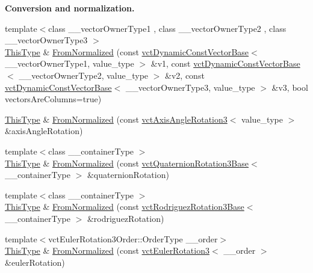 \begin{Indent}{\bf Conversion and normalization.}
\begin{DoxyCompactItemize}
\item 
{\footnotesize template$<$class \-\_\-\-\_\-vector\-Owner\-Type1 , class \-\_\-\-\_\-vector\-Owner\-Type2 , class \-\_\-\-\_\-vector\-Owner\-Type3 $>$ }\\\hyperlink{classvct_matrix_rotation3_base_a027be766cb10ca3c2ad8e85c28ed0af9}{This\-Type} \& \hyperlink{classvct_matrix_rotation3_base_a454968ed7ecbb2aefb9c63a8fe49df52}{From\-Normalized} (const \hyperlink{classvct_dynamic_const_vector_base}{vct\-Dynamic\-Const\-Vector\-Base}$<$ \-\_\-\-\_\-vector\-Owner\-Type1, value\-\_\-type $>$ \&v1, const \hyperlink{classvct_dynamic_const_vector_base}{vct\-Dynamic\-Const\-Vector\-Base}$<$ \-\_\-\-\_\-vector\-Owner\-Type2, value\-\_\-type $>$ \&v2, const \hyperlink{classvct_dynamic_const_vector_base}{vct\-Dynamic\-Const\-Vector\-Base}$<$ \-\_\-\-\_\-vector\-Owner\-Type3, value\-\_\-type $>$ \&v3, bool vectors\-Are\-Columns=true)
\item 
\hyperlink{classvct_matrix_rotation3_base_a027be766cb10ca3c2ad8e85c28ed0af9}{This\-Type} \& \hyperlink{classvct_matrix_rotation3_base_acda2e44cd70ae8b945712f9f7996bccf}{From\-Normalized} (const \hyperlink{classvct_axis_angle_rotation3}{vct\-Axis\-Angle\-Rotation3}$<$ value\-\_\-type $>$ \&axis\-Angle\-Rotation)
\item 
{\footnotesize template$<$class \-\_\-\-\_\-container\-Type $>$ }\\\hyperlink{classvct_matrix_rotation3_base_a027be766cb10ca3c2ad8e85c28ed0af9}{This\-Type} \& \hyperlink{classvct_matrix_rotation3_base_a343aca40687cf93638400f363dc44379}{From\-Normalized} (const \hyperlink{classvct_quaternion_rotation3_base}{vct\-Quaternion\-Rotation3\-Base}$<$ \-\_\-\-\_\-container\-Type $>$ \&quaternion\-Rotation)
\item 
{\footnotesize template$<$class \-\_\-\-\_\-container\-Type $>$ }\\\hyperlink{classvct_matrix_rotation3_base_a027be766cb10ca3c2ad8e85c28ed0af9}{This\-Type} \& \hyperlink{classvct_matrix_rotation3_base_a002538ebd9db06ea0c74ce82efb788da}{From\-Normalized} (const \hyperlink{classvct_rodriguez_rotation3_base}{vct\-Rodriguez\-Rotation3\-Base}$<$ \-\_\-\-\_\-container\-Type $>$ \&rodriguez\-Rotation)
\item 
{\footnotesize template$<$vct\-Euler\-Rotation3\-Order\-::\-Order\-Type \-\_\-\-\_\-order$>$ }\\\hyperlink{classvct_matrix_rotation3_base_a027be766cb10ca3c2ad8e85c28ed0af9}{This\-Type} \& \hyperlink{classvct_matrix_rotation3_base_a89512851c27c7fda645431fa0838c5dc}{From\-Normalized} (const \hyperlink{classvct_euler_rotation3}{vct\-Euler\-Rotation3}$<$ \-\_\-\-\_\-order $>$ \&euler\-Rotation)
\end{DoxyCompactItemize}
\end{Indent}
